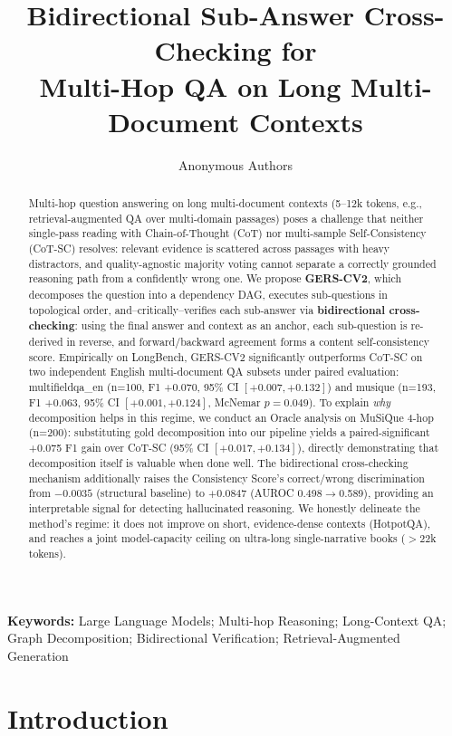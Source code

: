 \documentclass[11pt,a4paper]{article}
\title{\textbf{Bidirectional Sub-Answer Cross-Checking for\\Multi-Hop QA on Long Multi-Document Contexts}}
\author{Anonymous Authors}
\date{}
\begin{document}
\maketitle

\begin{abstract}
Multi-hop question answering on long multi-document contexts (5--12k tokens, e.g., retrieval-augmented QA over multi-domain passages) poses a challenge that neither single-pass reading with Chain-of-Thought (CoT) nor multi-sample Self-Consistency (CoT-SC) resolves: relevant evidence is scattered across passages with heavy distractors, and quality-agnostic majority voting cannot separate a correctly grounded reasoning path from a confidently wrong one. We propose \textbf{GERS-CV2}, which decomposes the question into a dependency DAG, executes sub-questions in topological order, and--critically--verifies each sub-answer via \textbf{bidirectional cross-checking}: using the final answer and context as an anchor, each sub-question is re-derived in reverse, and forward/backward agreement forms a content self-consistency score. Empirically on LongBench, GERS-CV2 significantly outperforms CoT-SC on two independent English multi-document QA subsets under paired evaluation: multifieldqa\_en (n=100, F1 +0.070, 95\% CI $[+0.007,+0.132]$) and musique (n=193, F1 +0.063, 95\% CI $[+0.001,+0.124]$, McNemar $p=0.049$). To explain \emph{why} decomposition helps in this regime, we conduct an Oracle analysis on MuSiQue 4-hop (n=200): substituting gold decomposition into our pipeline yields a paired-significant +0.075 F1 gain over CoT-SC (95\% CI $[+0.017,+0.134]$), directly demonstrating that decomposition itself is valuable when done well. The bidirectional cross-checking mechanism additionally raises the Consistency Score's correct/wrong discrimination from $-0.0035$ (structural baseline) to $+0.0847$ (AUROC 0.498$\to$0.589), providing an interpretable signal for detecting hallucinated reasoning. We honestly delineate the method's regime: it does not improve on short, evidence-dense contexts (HotpotQA), and reaches a joint model-capacity ceiling on ultra-long single-narrative books ($>$22k tokens).
\end{abstract}

\noindent\textbf{Keywords:} Large Language Models; Multi-hop Reasoning; Long-Context QA; Graph Decomposition; Bidirectional Verification; Retrieval-Augmented Generation

\section{Introduction}
\end{document}
